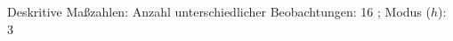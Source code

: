 				\label{tableValues:cjob09}
				\vspace*{-\baselineskip}
                    \begin{noten}
                	    \note{} Deskritive Maßzahlen:
                	    Anzahl unterschiedlicher Beobachtungen: 16%
                	    ; 
                	      Modus ($h$): 3
                     \end{noten}


